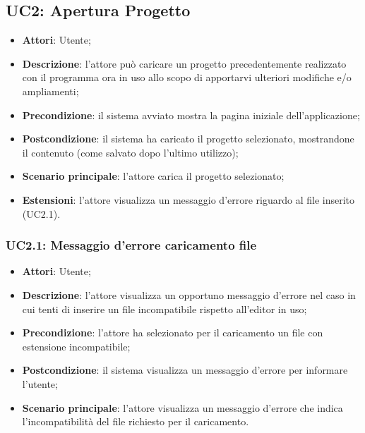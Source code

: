 \subsection{UC2: Apertura Progetto}
\label{UC2}
\begin{itemize}
	\item \textbf{Attori}: Utente;
	\item \textbf{Descrizione}: l'attore può caricare un progetto precedentemente realizzato con il programma ora in uso allo scopo di apportarvi ulteriori modifiche e/o ampliamenti;
	\item \textbf{Precondizione}: il sistema avviato mostra la pagina iniziale dell'applicazione;
	\item \textbf{Postcondizione}: il sistema ha caricato il progetto selezionato, mostrandone il contenuto (come salvato dopo l'ultimo utilizzo);
	\item \textbf{Scenario principale}: l'attore carica il progetto selezionato;
	\item \textbf{Estensioni}: l'attore visualizza un messaggio d'errore riguardo al file inserito (UC2.1).
\end{itemize}

\subsubsection{UC2.1: Messaggio d'errore caricamento file}
\label{UC2.1}
\begin{itemize}
	\item \textbf{Attori}: Utente;
	\item \textbf{Descrizione}: l'attore visualizza un opportuno messaggio d'errore nel caso in cui tenti di inserire un file incompatibile rispetto all'editor in uso;
	\item \textbf{Precondizione}: l'attore ha selezionato per il caricamento un file con estensione incompatibile;
	\item \textbf{Postcondizione}: il sistema visualizza un messaggio d'errore per informare l'utente;
	\item \textbf{Scenario principale}: l'attore visualizza un messaggio d'errore che indica l'incompatibilità del file richiesto per il caricamento.
\end{itemize}

